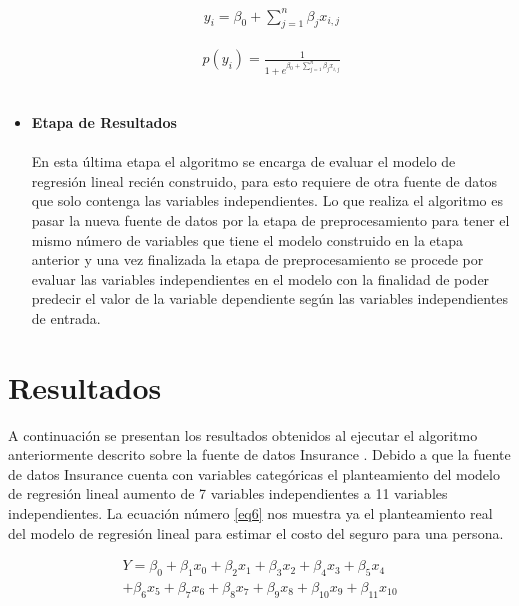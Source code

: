 \documentclass[letterpaper, 10 pt, conference]{ieeeconf}
\begin{document}
\begin{itemize}[leftmargin=*]
    \begin{equation} \label{eq4}
    \begin{split}
    y_i = \beta_0+\sum_{j=1}^{n}\beta_jx_{i,j}
    \end{split}
    \end{equation}
    
    \begin{equation} \label{eq5}
    \begin{split}
    p(y_i) = \frac{1}{1+e^{\beta_0+\sum_{j=1}^{n}\beta_jx_{i,j}}}
    \end{split}
    \end{equation}\\

    \item \textbf{Etapa de Resultados}
    \\ \\ En esta última etapa el algoritmo se encarga de evaluar el modelo de regresión lineal recién construido, para esto requiere de otra fuente de datos que solo contenga las variables independientes. Lo que realiza el algoritmo es pasar la nueva fuente de datos por la etapa de preprocesamiento para tener el mismo número de variables que tiene el modelo construido en la etapa anterior y una vez finalizada la etapa de preprocesamiento se procede por evaluar las variables independientes en el modelo con la finalidad de poder predecir el valor de la variable dependiente según las variables independientes de entrada.\\
    
\end{itemize}

\section{Resultados}

A continuación se presentan los resultados obtenidos al ejecutar el algoritmo anteriormente descrito sobre la fuente de datos Insurance \cite{dataset:2019}. Debido a que la fuente de datos Insurance \cite{dataset:2019} cuenta con variables categóricas el planteamiento del modelo de regresión lineal aumento de 7 variables independientes a 11 variables independientes. La ecuación número \ref{eq6} nos muestra ya el planteamiento real del modelo de regresión lineal para estimar el costo del seguro para una persona.

\begin{equation} \label{eq6}
\begin{split}
Y = \beta_0 + \beta_1x_0 + \beta_2x_1
    + \beta_3x_2 + \beta_4x_3 + \beta_5x_4 \\
    + \beta_6x_5 + \beta_7x_6 + \beta_8x_7 + \beta_9x_8 + \beta_{10}x_9 + \beta_{11}x_{10}
\end{split}
\end{equation}\\
\end{document}
